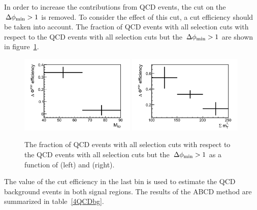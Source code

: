 In order to increase the contributions from QCD events, the cut on the $\,{\Delta\phi_{\rm min}}>1$ is removed.
To consider the effect of this cut, a cut efficiency should be taken into account. The 
fraction of QCD events with all selection cuts with respect to the QCD events with all selection 
cuts but the $\,{\Delta\phi_{\rm min}}>1$ are shown in figure~\ref{fig:3QCDbg}.\\
\begin{figure}[!Hhtb]
\centering
\includegraphics[width=0.49\textwidth]{QCDbginTauTau/Bin1-efficiency.png}
\includegraphics[width=0.49\textwidth]{QCDbginTauTau/Bin2-efficiency.png} \\
\caption{ The fraction of QCD events with all selection cuts with respect to the QCD events with all selection 
cuts but the $\,{\Delta\phi_{\rm min}}>1$ as a function of \mttwo (left) and \SumMT (right).}
\label{fig:3QCDbg}
\end{figure}

The value of the cut efficiency 
in the last bin is used to estimate the 
QCD background events in both signal regions. %
The results of the ABCD method are summarized in table~\ref{4QCDbg}.\\

